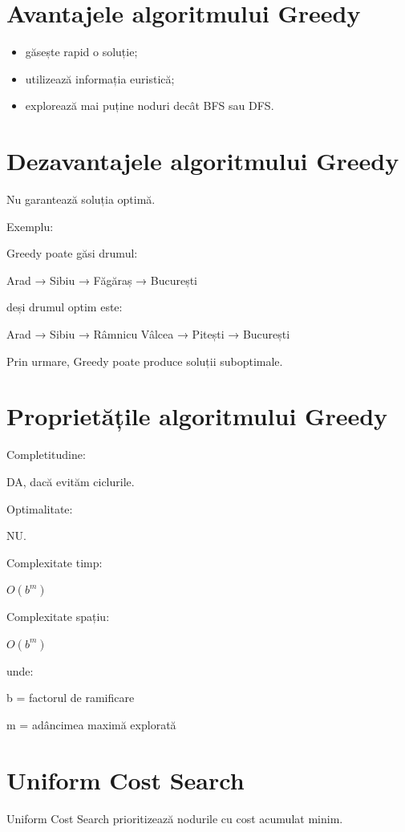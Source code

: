 \documentclass[12pt,a4paper]{article}
\begin{document}
\section{Avantajele algoritmului Greedy}

\begin{itemize}
\item găsește rapid o soluție;
\item utilizează informația euristică;
\item explorează mai puține noduri decât BFS sau DFS.
\end{itemize}

\section{Dezavantajele algoritmului Greedy}

Nu garantează soluția optimă.

Exemplu:

Greedy poate găsi drumul:

Arad → Sibiu → Făgăraș → București

deși drumul optim este:

Arad → Sibiu → Râmnicu Vâlcea → Pitești → București

Prin urmare, Greedy poate produce soluții suboptimale.

\section{Proprietățile algoritmului Greedy}

Completitudine:

DA, dacă evităm ciclurile.

Optimalitate:

NU.

Complexitate timp:

$O(b^m)$

Complexitate spațiu:

$O(b^m)$

unde:

b = factorul de ramificare

m = adâncimea maximă explorată

\section{Uniform Cost Search}

Uniform Cost Search prioritizează nodurile cu cost acumulat minim.
\end{document}
